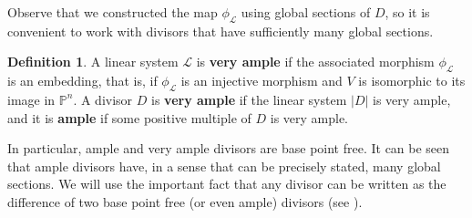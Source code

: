 \documentclass[a4paper, 12pt]{amsart}
\theoremstyle{definition}
\newtheorem{defn0}{Definition}[section]
\theoremstyle{plain}
\theoremstyle{plain}
\theoremstyle{plain}
\theoremstyle{plain}
\theoremstyle{remark}
\theoremstyle{remark}
\theoremstyle{plain}
\newenvironment{definition}{ \begin{defn0}}{\end{defn0}}
\begin{document}
	Observe that we constructed the map $\phi_\mathcal{L}$ using global sections of $D$, so it is convenient to work with divisors that have sufficiently many global sections.
	\begin{definition}
		A linear system $\mathcal{L}$ is \textbf{very ample} if the associated morphism $\phi_\mathcal{L}$ is an embedding, that is, if $\phi_\mathcal{L}$ is an injective morphism and $V$ is isomorphic to its image in $\mathbb{P}^n$. A divisor $D$ is \textbf{very ample} if the linear system $|D|$ is very ample, and it is \textbf{ample} if some positive multiple of $D$ is very ample.
	\end{definition}
	
	In particular, ample and very ample divisors are base point free. It can be seen that ample divisors have, in a sense that can be precisely stated, many global sections. We will use the important fact that any divisor can be written as the difference of two base point free (or even ample) divisors (see \cite{Hartshorne_1977}).
	
\end{document}
